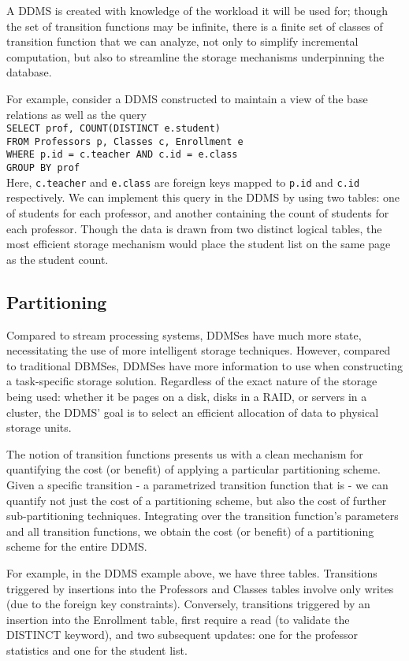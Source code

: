 A DDMS is created with knowledge of the workload it will be used for; though the set of transition functions may be infinite, there is a finite set of classes of transition function that we can analyze, not only to simplify incremental computation, but also to streamline the storage mechanisms underpinning the database.

For example, consider a DDMS constructed to maintain a view of the base relations as well as the query\texttt{\\
SELECT prof, COUNT(DISTINCT e.student)\\
FROM Professors p, Classes c, Enrollment e\\
WHERE p.id = c.teacher AND c.id = e.class\\
GROUP BY prof\\
}
Here, \texttt{c.teacher} and \texttt{e.class} are foreign keys mapped to \texttt{p.id} and \texttt{c.id} respectively.  We can implement this query in the DDMS by using two tables: one of students for each professor, and another containing the count of students for each professor.  Though the data is drawn from two distinct logical tables, the most efficient storage mechanism would place the student list on the same page as the student count.

\subsection{Partitioning}
Compared to stream processing systems, DDMSes have much more state, necessitating the use of more intelligent storage techniques.  However, compared to traditional DBMSes, DDMSes have more information to use when constructing a task-specific storage solution.  Regardless of the exact nature of the storage being used: whether it be pages on a disk, disks in a RAID, or servers in a cluster, the DDMS' goal is to select an efficient allocation of data to physical storage units.

The notion of transition functions presents us with a clean mechanism for quantifying the cost (or benefit) of applying a particular partitioning scheme.  Given a specific transition - a parametrized transition function that is - we can quantify not just the cost of a partitioning scheme, but also the cost of further sub-partitioning techniques.  Integrating over the transition function's parameters and all transition functions, we obtain the cost (or benefit) of a partitioning scheme for the entire DDMS.  

For example, in the DDMS example above, we have three tables.  Transitions triggered by insertions into the Professors and Classes tables involve only writes (due to the foreign key constraints).  Conversely, transitions triggered by an insertion into the Enrollment table, first require a read (to validate the DISTINCT keyword), and two subsequent updates: one for the professor statistics and one for the student list.

